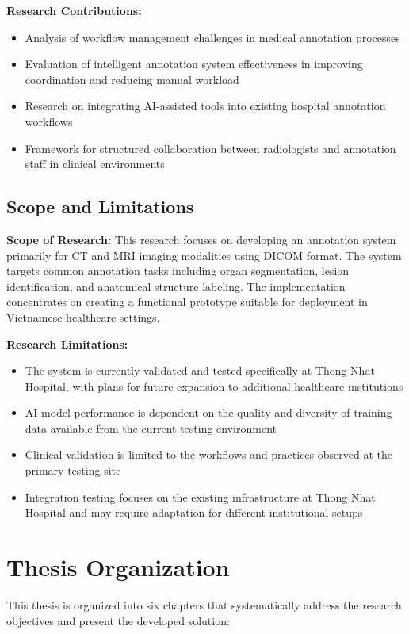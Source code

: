 \textbf{Research Contributions:}
\begin{itemize}
    \item Analysis of workflow management challenges in medical annotation processes
    \item Evaluation of intelligent annotation system effectiveness in improving coordination and reducing manual workload
    \item Research on integrating AI-assisted tools into existing hospital annotation workflows
    \item Framework for structured collaboration between radiologists and annotation staff in clinical environments
\end{itemize}

\subsection{Scope and Limitations}

\textbf{Scope of Research:}
This research focuses on developing an annotation system primarily for CT and MRI imaging modalities using DICOM format. The system targets common annotation tasks including organ segmentation, lesion identification, and anatomical structure labeling. The implementation concentrates on creating a functional prototype suitable for deployment in Vietnamese healthcare settings.

\textbf{Research Limitations:}
\begin{itemize}
    \item The system is currently validated and tested specifically at Thong Nhat Hospital, with plans for future expansion to additional healthcare institutions
    \item AI model performance is dependent on the quality and diversity of training data available from the current testing environment
    \item Clinical validation is limited to the workflows and practices observed at the primary testing site
    \item Integration testing focuses on the existing infrastructure at Thong Nhat Hospital and may require adaptation for different institutional setups
\end{itemize}

\section{Thesis Organization}

This thesis is organized into six chapters that systematically address the research objectives and present the developed solution:

